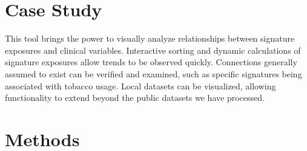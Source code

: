 \documentclass[12pt, letterpaper]{article}
\begin{document}
\section{Case Study}
This tool brings the power to visually analyze relationships between signature exposures and clinical variables.
Interactive sorting and dynamic calculations of signature exposures allow trends to be observed quickly.
Connections generally assumed to exist can be verified and examined, such as specific signatures being associated with tobacco usage.
Local datasets can be visualized, allowing functionality to extend beyond the public datasets we have processed.

\section{Methods}

{}

\end{document}
